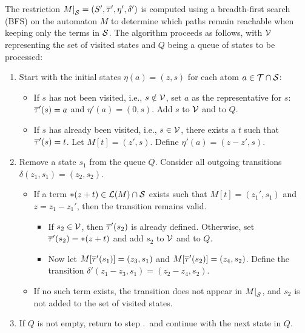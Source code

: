 The restriction $\restr{M}{\Set} = (S', \otau', \eta', \delta')$ is computed using a breadth-first search (BFS) on the automaton $M$ to determine which paths remain reachable when keeping only the terms in $\mathcal{S}$.
The algorithm proceeds as follows, with $\mathcal{V}$ representing the set of visited states and $Q$ being a queue of states to be processed:

\begin{enumerate}
    \item Start with the initial states $\eta(a) = (z, s)$ for each atom $a \in \mathcal{T} \cap \mathcal{S}$:
          \begin{itemize}
              \item If $s$ has not been visited, i.e., $s \notin \mathcal{V}$, set $a$ as the representative for $s$:
                    $\overline{\tau}'(s) = a$ and $\eta'(a) = (0, s)$.
                    Add $s$ to $\mathcal{V}$ and to $Q$.
              \item If $s$ has already been visited, i.e., $s \in \mathcal{V}$, there exists a $t$ such that $\overline{\tau}'(s) = t$.
                    Let $M[t] = (z', s)$.
                    Define $\eta'(a) = (z - z', s)$.
          \end{itemize}

    \item\label{item:remove-from-Q} Remove a state $s_1$ from the queue $Q$.
          Consider all outgoing transitions $\delta(z_1, s_1) = (z_2, s_2)$.
          \begin{itemize}
              \item If a term $*(z+t) \in \mathcal{L}(M) \cap \mathcal{S}$ exists such that $M[t] = (z_1', s_1)$ and $z = z_1 - z_1'$,
                    then the transition remains valid.
                    \begin{itemize}
                        \item If $s_2 \in \mathcal{V}$, then $\overline{\tau}'(s_2)$ is already defined.
                              Otherwise, set $\overline{\tau}'(s_2) = *(z+t)$ and add $s_2$ to $\mathcal{V}$ and to $Q$.
                        \item Now let $M[\overline{\tau}'(s_1)] = (z_3, s_1)$ and $M[\overline{\tau}'(s_2)] = (z_4, s_2)$.
                              Define the transition $\delta'(z_1 - z_3, s_1) = (z_2 - z_4, s_2)$.
                    \end{itemize}
              \item If no such term exists, the transition does not appear in $\restr{M}{\Set}$, and $s_2$ is not added to the set of visited states.
          \end{itemize}
    \item If $Q$ is not empty, return to step .\ and continue with the next state in $Q$.
\end{enumerate}

